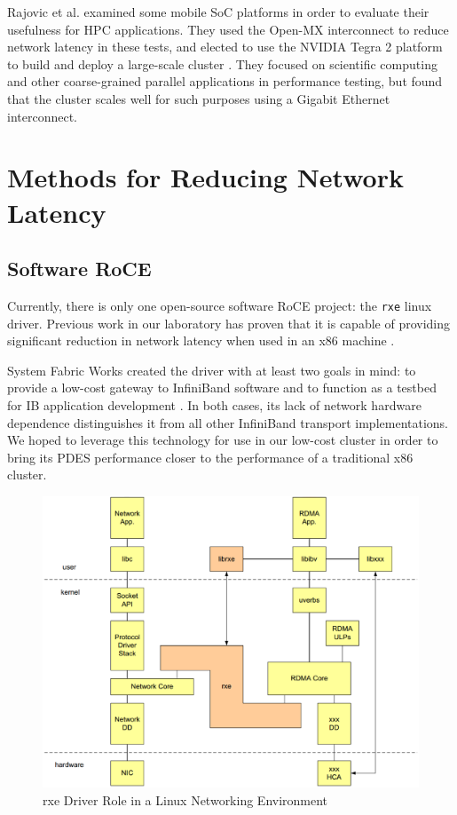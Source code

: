 \documentclass[11pt]{book}
\begin{document}
Rajovic et al. \cite{rajovic-13} examined some mobile SoC platforms in order to
evaluate their usefulness for HPC applications. They used the Open-MX
interconnect to reduce network latency in these tests, and elected to use the
NVIDIA Tegra 2 platform to build and deploy a large-scale cluster
\cite{rajovic-14}. They focused on scientific computing and other coarse-grained
parallel applications in performance testing, but found that the cluster scales
well for such purposes using a Gigabit Ethernet interconnect.

\newpage
\chapter{Methods for Reducing Network Latency}
\label{latency_reduction}

\section{\textbf{Software RoCE}}

Currently, there is only one open-source software RoCE project: the \verb;rxe;
linux driver. Previous work in our laboratory has proven that it is capable of
providing significant reduction in network latency when used in an x86 machine
\cite{lancaster-10}.

System Fabric Works created the driver with at least two goals in mind: to
provide a low-cost gateway to InfiniBand software and to function as a testbed
for IB application development \cite{pearson-10}. In both cases, its lack of
network hardware dependence distinguishes it from all other InfiniBand transport
implementations. We hoped to leverage this technology for use in our low-cost
cluster in order to bring its PDES performance closer to the performance of a
traditional x86 cluster.

\begin{figure}[h]
\includegraphics[width=\textwidth]{rxe_linux}
\caption{rxe Driver Role in a Linux Networking Environment \cite{pearson-10}}
\label{rxe-linux}
\end{figure}
\end{document}
